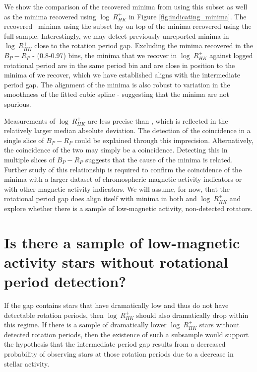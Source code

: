 We show the comparison of the recovered minima from \rper{} using this subset as well as the minima recovered using $\log \ R^{+}_{HK}$ in Figure \ref{fig:indicating_minima}.
The recovered \rper{} \ minima using the subset lay on top of the \rper{} minima recovered using the full sample.
Interestingly, we may detect previously unreported minima in $\log \ R^{+}_{HK}$ close to the rotation period gap.
Excluding the minima recovered in the $B_P-R_P$ - (0.8-0.97) bins, the minima that we recover in $\log \ R^{+}_{HK}$ against logged rotational period are in the same period bin and are close in position to the minima of \rper{} we recover, which we have established aligns with the intermediate period gap.
The alignment of the minima is also robust to variation in the smoothness of the fitted cubic spline - suggesting that the minima are not spurious.

Measurements of $\log \ R^{+}_{HK}$ are less precise than \rper{}, which is reflected in the relatively larger median absolute deviation.
The detection of the coincidence in a single slice of $B_P-R_P$ could be explained through this imprecision.
Alternatively, the coincidence of the two may simply be a coincidence.
Detecting this in multiple slices of $B_P-R_P$ suggests that the cause of the minima is related.
Further study of this relationship is required to confirm the coincidence of the minima with a larger dataset of chromospheric magnetic activity indicators or with other magnetic activity indicators.
We will assume, for now, that the rotational period gap does align itself with minima in both \rper{} and $\log \ R^{+}_{HK}$ and explore whether there is a sample of low-magnetic activity, non-detected rotators.

\section{Is there a sample of low-magnetic activity stars without rotational period detection?}
\label{sec:low_activity_gap}

If the gap contains stars that have dramatically low \rper{} and thus do not have detectable rotation periods, then $\log \ R^{+}_{HK}$ should also dramatically drop within this regime.
If there is a sample of dramatically lower $\log \ R^{+}_{HK}$ stars without detected rotation periods, then the existence of such a subsample would support the hypothesis that the intermediate period gap results from a decreased probability of observing stars at those rotation periods due to a decrease in stellar activity.

